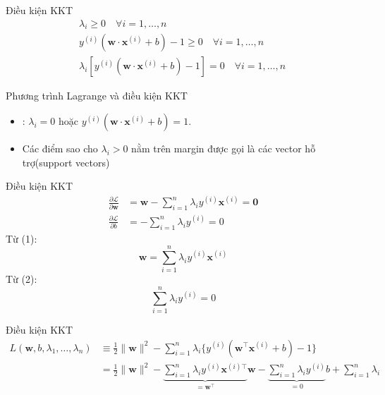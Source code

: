 \documentclass[serif, aspectratio=169]{beamer}
\begin{document}
	\begin{frame}{Điều kiện KKT}
		\begin{align*}
			& \lambda_i \geq 0 \quad \forall i=1,\ldots,n \quad\\
			& y^{(i)}(\mathbf{w} \cdot \mathbf{x}^{(i)} + b) - 1 \geq 0 \quad \forall i=1,\ldots,n \quad\\
			& \lambda_i [y^{(i)}(\mathbf{w} \cdot \mathbf{x}^{(i)} + b) - 1] = 0 \quad \forall i=1,\ldots,n \quad 
		\end{align*}
	\end{frame}
	
	\begin{frame}{Phương trình Lagrange và điều kiện KKT}
		\begin{itemize}
			\item {} : $\lambda_i = 0$ hoặc $y^{(i)}(\mathbf{w} \cdot \mathbf{x}^{(i)} + b) = 1$.
			\item Các điểm sao cho $\lambda_i > 0$ nằm trên margin được gọi là các vector hỗ trợ(support vectors)
			
		\end{itemize}
	\end{frame}
	\begin{frame}{Điều kiện KKT}
		\begin{align}
			\frac{\partial \mathcal{L}}{\partial \mathbf{w}} &= \mathbf{w} - \sum_{i=1}^{n} \lambda_i y^{(i)} \mathbf{x}^{(i)} = \mathbf{0} \\
			\frac{\partial \mathcal{L}}{\partial b} &= - \sum_{i=1}^{n} \lambda_i y^{(i)} = 0
		\end{align}
		Từ (1): \begin{equation}
			\mathbf{w} = \sum_{i=1}^{n} \lambda_i y^{(i)} \mathbf{x}^{(i)}
		\end{equation}
		Từ (2): \begin{equation}
			\sum_{i=1}^{n} \lambda_i y^{(i)} = 0
		\end{equation}
	\end{frame}
	
	\begin{frame}{Điều kiện KKT}
		\begin{align*} 
			L(\bm{w}, b, \lambda_1, \dots, \lambda_n) &\equiv \frac{1}{2}\|\bm{w}\|^2 - \sum_{i=1}^n \lambda_i \{ y^{(i)} (\bm{w}^{\top} \bm{x}^{(i)} + b) - 1 \} \\
			&= \frac{1}{2}\|\bm{w}\|^2 - \underbrace{\sum_{i=1}^n \lambda_i y^{(i)} \bm{x}^{(i)\top}}_{=\bm{w}^{\top}} \bm{w} - \underbrace{\sum_{i=1}^n\lambda_i y^{(i)}}_{=0} b + \sum_{i=1}^n \lambda_i 
		\end{align*}
 	\end{frame}
	
\end{document}
